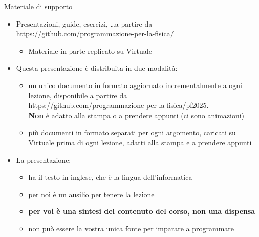 \begin{frame}{Materiale di supporto}

  \begin{itemize}[<+->]

  \item Presentazioni, guide, esercizi, \ldots a partire da
    \url{https://github.com/programmazione-per-la-fisica/}
    \begin{itemize}[<.->]
    \item Materiale in parte replicato su Virtuale
    \end{itemize}

  \item Questa presentazione è distribuita in due modalità:
    \begin{itemize}[<.->]
    \item un unico documento in formato  aggiornato incrementalmente a
      ogni lezione, disponibile a partire da\\
      {\smaller \url{https://github.com/programmazione-per-la-fisica/pf2025}}.\\
      \textbf{Non} è adatto alla stampa o a prendere appunti (ci sono
      animazioni)
    \item più documenti in formato  separati per ogni argomento,
      caricati su Virtuale prima di ogni lezione, adatti alla stampa e a
      prendere appunti
    \end{itemize}

  \item La presentazione:
    \begin{itemize}[<.->]
    \item ha il testo in inglese, che è la lingua dell'informatica
    \item per noi è un ausilio per tenere la lezione
    \item \textbf{per voi è una sintesi del contenuto del corso, non una dispensa}
    \item non può essere la vostra unica fonte per imparare a programmare
    \end{itemize}

  \end{itemize}

\end{frame}

